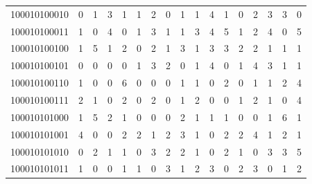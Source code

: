 \documentclass[10pt,a4paper]{article}
\begin{document}
\begin{longtable}{ |c|c|c|c|c|c|c|c|c|c|c|c|c|c|c|c|c| }
    100010100010              & 0                            & 1                                & 3                            & 1                              & 1   & 2   & 0   & 1   & 1   & 4   & 1   & 0   & 2   & 3   & 3   & 0   \\
    100010100011              & 1                            & 0                                & 4                            & 0                              & 1   & 3   & 1   & 1   & 3   & 4   & 5   & 1   & 2   & 4   & 0   & 5   \\
    100010100100              & 1                            & 5                                & 1                            & 2                              & 0   & 2   & 1   & 3   & 1   & 3   & 3   & 2   & 2   & 1   & 1   & 1   \\
    100010100101              & 0                            & 0                                & 0                            & 0                              & 1   & 3   & 2   & 0   & 1   & 4   & 0   & 1   & 4   & 3   & 1   & 1   \\
    100010100110              & 1                            & 0                                & 0                            & 6                              & 0   & 0   & 0   & 1   & 1   & 0   & 2   & 0   & 1   & 1   & 2   & 4   \\
    100010100111              & 2                            & 1                                & 0                            & 2                              & 0   & 2   & 0   & 1   & 2   & 0   & 0   & 1   & 2   & 1   & 0   & 4   \\
    100010101000              & 1                            & 5                                & 2                            & 1                              & 0   & 0   & 0   & 2   & 1   & 1   & 1   & 0   & 0   & 1   & 6   & 1   \\
    100010101001              & 4                            & 0                                & 0                            & 2                              & 2   & 1   & 2   & 3   & 1   & 0   & 2   & 2   & 4   & 1   & 2   & 1   \\
    100010101010              & 0                            & 2                                & 1                            & 1                              & 0   & 3   & 2   & 2   & 1   & 0   & 2   & 1   & 0   & 3   & 3   & 5   \\
    100010101011              & 1                            & 0                                & 0                            & 1                              & 1   & 0   & 3   & 1   & 2   & 3   & 0   & 2   & 3   & 0   & 1   & 2   \\

\end{longtable}
\end{document}
